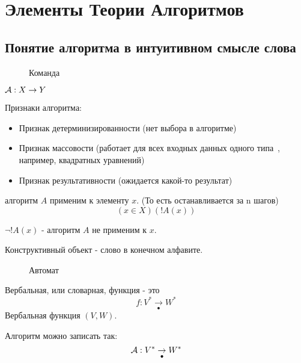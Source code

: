 \chapter{Элементы Теории Алгоритмов}
\section{Понятие алгоритма в интуитивном смысле слова}


\begin{figure}[ht]
    \centering
    \caption{Команда}
\end{figure}

$ {\cal A}:X \to Y$

\medskip

Признаки алгоритма:
\begin{itemize}
	\item Признак детерминизированности (нет выбора в алгоритме)
	\item Признак массовости (работает для всех входных данных одного типа~, например,
		квадратных уравнений)
	\item Признак результативности (ожидается какой-то результат)
\end{itemize}


\begin{definition}
алгоритм $A$ применим к элементу $x$. (То есть останавливается за n шагов) \[
    (x \in X)(!A(x))
\] 
\end{definition}

\begin{definition}
$\lnot!A(x)$ - алгоритм $A$ не применим к $x$.
\end{definition}

\begin{definition}
Конструктивный объект - слово в конечном алфавите.
\end{definition}

\begin{figure}[h]
    \centering
    \caption{Автомат}
    \label{automat}
\end{figure}

\medskip

\begin{definition}
Вербальная, или словарная, функция - это \[
	f: V^{*} \underset{\bullet}{\to} W^{*}
\] 
Вербальная функция $(V,W)$.

\end{definition}

\begin{definition}
Алгоритм можно записать так: \[
	{\cal A}: V^{*} \underset{\bullet}{\to } W^{*}
\] 
\end{definition}

